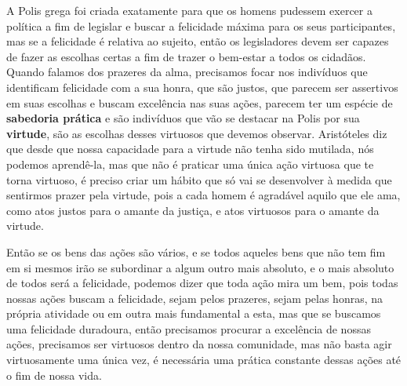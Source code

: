 \documentclass[a4paper,oneside,12pt]{article}
\begin{document}
A Polis grega foi criada exatamente para que os homens pudessem exercer a política a fim de legislar e buscar a felicidade máxima para os seus participantes, mas se a felicidade é relativa ao sujeito, então os legisladores devem ser capazes de fazer as escolhas certas a fim de trazer o bem-estar a todos os cidadãos. Quando falamos dos prazeres da alma, precisamos focar nos indivíduos que identificam felicidade com a sua honra, que são justos, que parecem ser assertivos em suas escolhas e buscam excelência nas suas ações, parecem ter um espécie de \textbf{sabedoria prática} e são indivíduos que vão se destacar na Polis por sua \textbf{virtude}, são as escolhas desses virtuosos que devemos observar. Aristóteles diz que desde que nossa capacidade para a virtude não tenha sido mutilada, nós podemos aprendê-la, mas que não é praticar uma única ação virtuosa que te torna virtuoso, é preciso criar um hábito que só vai se desenvolver à medida que sentirmos prazer pela virtude, pois a cada homem é agradável aquilo que ele ama, como atos justos para o amante da justiça, e atos virtuosos para o amante da virtude.

Então se os bens das ações são vários, e se todos aqueles bens que não tem fim em si mesmos irão se subordinar a algum outro mais absoluto, e o mais absoluto de todos será a felicidade, podemos dizer que toda ação mira um bem, pois todas nossas ações buscam a felicidade, sejam pelos prazeres, sejam pelas honras, na própria atividade ou em outra mais fundamental a esta, mas que se buscamos uma felicidade duradoura, então precisamos procurar a excelência de nossas ações, precisamos ser virtuosos dentro da nossa comunidade, mas não basta agir virtuosamente uma única vez, é necessária uma prática constante dessas ações até o fim de nossa vida.
\end{document}
